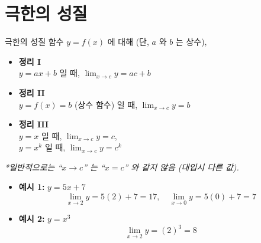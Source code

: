 \documentclass[aspectratio=169]{beamer}
\begin{document}
\section{극한의 성질}
\begin{frame}{극한의 성질}
  함수 \( y = f(x) \) 에 대해 (단, \( a \) 와 \( b \) 는 상수),
  \begin{itemize}
    \item \textbf{정리 I}  \\
    \( y = ax + b \) 일 때,  
    \( \lim_{x \to c} y = ac + b \)  
    
    \item \textbf{정리 II}  \\
    \( y = f(x) = b \) (상수 함수) 일 때,  
    \( \lim_{x \to c} y = b \)  

    \item \textbf{정리 III}  \\
    \( y = x \) 일 때, \( \lim_{x \to c} y = c \),   \\
    \( y = x^k \) 일 때, \( \lim_{x \to c} y = c^k \)  
  \end{itemize}
  \emph{*일반적으로는 “\( x \to c \)” 는 “\( x = c \)” 와 같지 않음 (대입시 다른 값).}


  \begin{itemize}
    \item \textbf{예시 1:} \( y = 5x + 7 \)  
    \[
      \lim_{x \to 2} y = 5(2) + 7 = 17,\quad
      \lim_{x \to 0} y = 5(0) + 7 = 7
    \]

    \item \textbf{예시 2:} \( y = x^3 \)  
    \[
      \lim_{x \to 2} y = (2)^3 = 8
    \]
  \end{itemize}
\end{frame}
\end{document}
